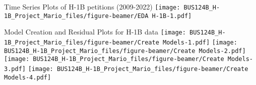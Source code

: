 \documentclass[
  ignorenonframetext,
]{beamer}
\begin{document}
\begin{frame}{Time Series Plots of H-1B petitions (2009-2022)}
\label{time-series-plots-of-h-1b-petitions-2009-2022}
\texttt{[image: BUS124B\_H-1B\_Project\_Mario\_files/figure-beamer/EDA H-1B-1.pdf]}
\end{frame}

\begin{frame}[fragile]{Model Creation and Residual Plots for H-1B data}
\label{model-creation-and-residual-plots-for-h-1b-data}
\texttt{[image: BUS124B\_H-1B\_Project\_Mario\_files/figure-beamer/Create Models-1.pdf]}
\texttt{[image: BUS124B\_H-1B\_Project\_Mario\_files/figure-beamer/Create Models-2.pdf]}
\texttt{[image: BUS124B\_H-1B\_Project\_Mario\_files/figure-beamer/Create Models-3.pdf]}
\texttt{[image: BUS124B\_H-1B\_Project\_Mario\_files/figure-beamer/Create Models-4.pdf]}


\end{frame}
\end{document}
